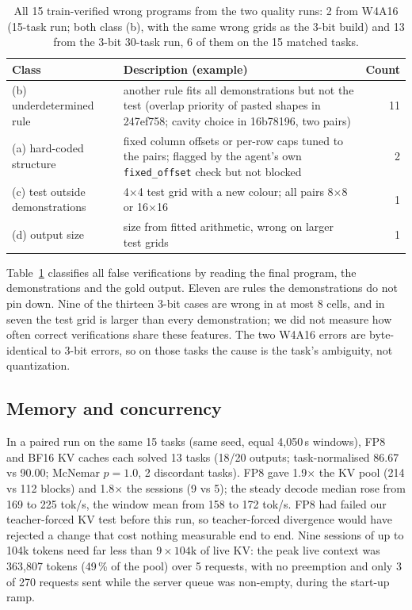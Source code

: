 \documentclass[11pt]{article}
\begin{document}
\begin{table}[t]
\centering\small
\begin{tabularx}{\linewidth}{@{}lXr@{}}
\toprule
Class & Description (example) & Count \\
\midrule
(b) underdetermined rule & another rule fits all demonstrations but not the test (overlap priority of pasted shapes in 247ef758; cavity choice in 16b78196, two pairs) & 11 \\
(a) hard-coded structure & fixed column offsets or per-row caps tuned to the pairs; flagged by the agent's own \texttt{fixed\_offset} check but not blocked & 2 \\
(c) test outside demonstrations & 4$\times$4 test grid with a new colour; all pairs 8$\times$8 or 16$\times$16 & 1 \\
(d) output size & size from fitted arithmetic, wrong on larger test grids & 1 \\
\bottomrule
\end{tabularx}
\caption{All 15 train-verified wrong programs from the two quality runs: 2 from W4A16 (15-task run; both class (b), with the same wrong grids as the 3-bit build) and 13 from the 3-bit 30-task run, 6 of them on the 15 matched tasks.}
\label{tab:fv}
\end{table}
Table~\ref{tab:fv} classifies all false verifications by reading the final program, the demonstrations and the gold output. Eleven are rules the demonstrations do not pin down. Nine of the thirteen 3-bit cases are wrong in at most 8 cells, and in seven the test grid is larger than every demonstration; we did not measure how often correct verifications share these features. The two W4A16 errors are byte-identical to 3-bit errors, so on those tasks the cause is the task's ambiguity, not quantization.

\subsection{Memory and concurrency}
In a paired run on the same 15 tasks (same seed, equal 4{,}050\,s windows), FP8 and BF16 KV caches each solved 13 tasks (18/20 outputs; task-normalised 86.67 vs 90.00; McNemar $p=1.0$, 2 discordant tasks). FP8 gave 1.9$\times$ the KV pool (214 vs 112 blocks) and 1.8$\times$ the sessions (9 vs 5); the steady decode median rose from 169 to 225 tok/s, the window mean from 158 to 172 tok/s. FP8 had failed our teacher-forced KV test before this run, so teacher-forced divergence would have rejected a change that cost nothing measurable end to end. Nine sessions of up to 104k tokens need far less than $9\times104$k of live KV: the peak live context was 363{,}807 tokens (49\,\% of the pool) over 5 requests, with no preemption and only 3 of 270 requests sent while the server queue was non-empty, during the start-up ramp.
\end{document}
